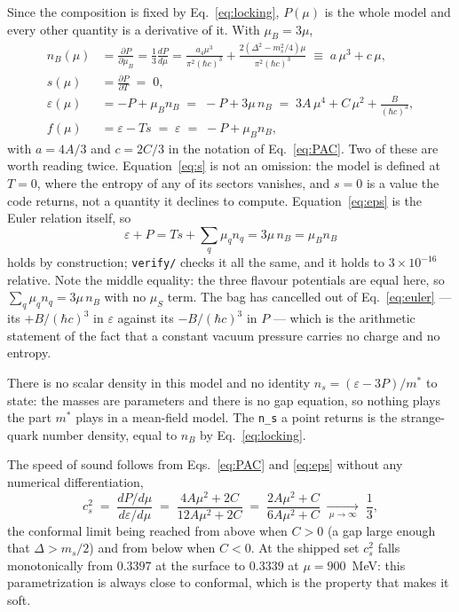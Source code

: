 \documentclass[aps,prc,onecolumn,superscriptaddress,nofootinbib,10pt]{revtex4-2}
\newcommand{\nB}{n_B}
\newcommand{\muB}{\mu_B}
\newcommand{\muS}{\mu_S}
\newcommand{\hc}{(\hbar c)^3}
\newcommand{\ms}{m_s}
\begin{document}
Since the composition is fixed by Eq.~\eqref{eq:locking}, $P(\mu)$ is the
whole model and every other quantity is a derivative of it. With
$\muB = 3\mu$,
%
\begin{align}
\nB(\mu) &= \frac{\partial P}{\partial \muB}
          = \frac{1}{3}\frac{dP}{d\mu}
          = \frac{a_4 \mu^3}{\pi^2\hc}
            + \frac{2\left(\Delta^2 - \ms^2/4\right)\mu}{\pi^2\hc}
          \;\equiv\; a\,\mu^3 + c\,\mu ,
\label{eq:nB} \\[4pt]
s(\mu) &= \frac{\partial P}{\partial T} \;=\; 0 ,
\label{eq:s} \\[4pt]
\varepsilon(\mu) &= -P + \muB \nB \;=\; -P + 3\mu\, \nB
                  \;=\; 3A\,\mu^4 + C\,\mu^2 + \frac{B}{\hc} ,
\label{eq:eps} \\[4pt]
f(\mu) &= \varepsilon - T s \;=\; \varepsilon
        \;=\; -P + \muB \nB ,
\label{eq:f}
\end{align}
%
with $a = 4A/3$ and $c = 2C/3$ in the notation of Eq.~\eqref{eq:PAC}. Two of
these are worth reading twice. Equation~\eqref{eq:s} is not an omission: the
model is defined at $T = 0$, where the entropy of any of its sectors vanishes,
and $s = 0$ is a value the code returns, not a quantity it declines to
compute. Equation~\eqref{eq:eps} is the Euler relation itself, so
%
\begin{equation}
\varepsilon + P = T s + \sum_q \mu_q n_q = 3\mu\,\nB = \muB \nB
\label{eq:euler}
\end{equation}
%
holds by construction; \texttt{verify/} checks it all the same, and it holds to
$3\times10^{-16}$ relative. Note the middle equality: the three flavour
potentials are equal here, so $\sum_q \mu_q n_q = 3\mu\,\nB$ with no $\muS$
term. The bag has cancelled out of Eq.~\eqref{eq:euler} --- its $+B/\hc$ in
$\varepsilon$ against its $-B/\hc$ in $P$ --- which is the arithmetic
statement of the fact that a constant vacuum pressure carries no charge and no
entropy.

There is no scalar density in this model and no identity
$n_s = (\varepsilon - 3P)/m^*$ to state: the masses are parameters and there is
no gap equation, so nothing plays the part $m^*$ plays in a mean-field model.
The \texttt{n\_s} a point returns is the strange-quark number density, equal to
$\nB$ by Eq.~\eqref{eq:locking}.

The speed of sound follows from Eqs.~\eqref{eq:PAC} and \eqref{eq:eps} without
any numerical differentiation,
%
\begin{equation}
c_s^2 \;=\; \frac{dP/d\mu}{d\varepsilon/d\mu}
       \;=\; \frac{4A\mu^2 + 2C}{12A\mu^2 + 2C}
       \;=\; \frac{2A\mu^2 + C}{6A\mu^2 + C}
       \;\xrightarrow[\ \mu \to \infty\ ]{}\; \frac{1}{3} ,
\label{eq:cs2}
\end{equation}
%
the conformal limit being reached from above when $C > 0$ (a gap large enough
that $\Delta > \ms/2$) and from below when $C < 0$. At the shipped set
$c_s^2$ falls monotonically from $0.3397$ at the surface to $0.3339$ at
$\mu = 900$~MeV: this parametrization is always close to conformal, which is
the property that makes it soft.
\end{document}
